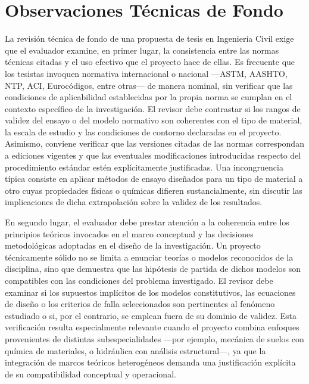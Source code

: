 \newpage
\section{Observaciones Técnicas de Fondo}

La revisión técnica de fondo de una propuesta de tesis en Ingeniería Civil exige que el evaluador examine, en primer lugar, la consistencia entre las normas técnicas citadas y el uso efectivo que el proyecto hace de ellas. Es frecuente que los tesistas invoquen normativa internacional o nacional ---ASTM, AASHTO, NTP, ACI, Eurocódigos, entre otras--- de manera nominal, sin verificar que las condiciones de aplicabilidad establecidas por la propia norma se cumplan en el contexto específico de la investigación. El revisor debe contrastar si los rangos de validez del ensayo o del modelo normativo son coherentes con el tipo de material, la escala de estudio y las condiciones de contorno declaradas en el proyecto. Asimismo, conviene verificar que las versiones citadas de las normas correspondan a ediciones vigentes y que las eventuales modificaciones introducidas respecto del procedimiento estándar estén explícitamente justificadas. Una incongruencia típica consiste en aplicar métodos de ensayo diseñados para un tipo de material a otro cuyas propiedades físicas o químicas difieren sustancialmente, sin discutir las implicaciones de dicha extrapolación sobre la validez de los resultados.

En segundo lugar, el evaluador debe prestar atención a la coherencia entre los principios teóricos invocados en el marco conceptual y las decisiones metodológicas adoptadas en el diseño de la investigación. Un proyecto técnicamente sólido no se limita a enunciar teorías o modelos reconocidos de la disciplina, sino que demuestra que las hipótesis de partida de dichos modelos son compatibles con las condiciones del problema investigado. El revisor debe examinar si los supuestos implícitos de los modelos constitutivos, las ecuaciones de diseño o los criterios de falla seleccionados son pertinentes al fenómeno estudiado o si, por el contrario, se emplean fuera de su dominio de validez. Esta verificación resulta especialmente relevante cuando el proyecto combina enfoques provenientes de distintas subespecialidades ---por ejemplo, mecánica de suelos con química de materiales, o hidráulica con análisis estructural---, ya que la integración de marcos teóricos heterogéneos demanda una justificación explícita de su compatibilidad conceptual y operacional.

